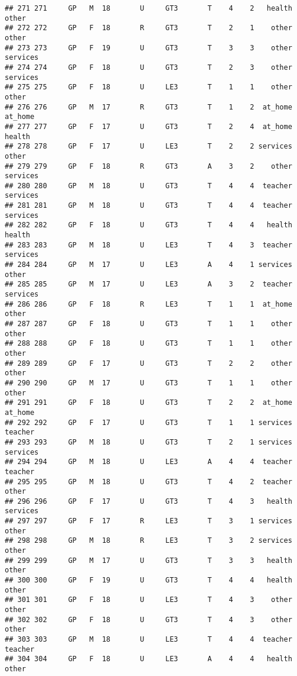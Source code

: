 \documentclass[]{article}
\begin{document}
\begin{verbatim}
## 271 271     GP   M  18       U     GT3       T    4    2   health    other
## 272 272     GP   F  18       R     GT3       T    2    1    other    other
## 273 273     GP   F  19       U     GT3       T    3    3    other services
## 274 274     GP   F  18       U     GT3       T    2    3    other services
## 275 275     GP   F  18       U     LE3       T    1    1    other    other
## 276 276     GP   M  17       R     GT3       T    1    2  at_home  at_home
## 277 277     GP   F  17       U     GT3       T    2    4  at_home   health
## 278 278     GP   F  17       U     LE3       T    2    2 services    other
## 279 279     GP   F  18       R     GT3       A    3    2    other services
## 280 280     GP   M  18       U     GT3       T    4    4  teacher services
## 281 281     GP   M  18       U     GT3       T    4    4  teacher services
## 282 282     GP   F  18       U     GT3       T    4    4   health   health
## 283 283     GP   M  18       U     LE3       T    4    3  teacher services
## 284 284     GP   M  17       U     LE3       A    4    1 services    other
## 285 285     GP   M  17       U     LE3       A    3    2  teacher services
## 286 286     GP   F  18       R     LE3       T    1    1  at_home    other
## 287 287     GP   F  18       U     GT3       T    1    1    other    other
## 288 288     GP   F  18       U     GT3       T    1    1    other    other
## 289 289     GP   F  17       U     GT3       T    2    2    other    other
## 290 290     GP   M  17       U     GT3       T    1    1    other    other
## 291 291     GP   F  18       U     GT3       T    2    2  at_home  at_home
## 292 292     GP   F  17       U     GT3       T    1    1 services  teacher
## 293 293     GP   M  18       U     GT3       T    2    1 services services
## 294 294     GP   M  18       U     LE3       A    4    4  teacher  teacher
## 295 295     GP   M  18       U     GT3       T    4    2  teacher    other
## 296 296     GP   F  17       U     GT3       T    4    3   health services
## 297 297     GP   F  17       R     LE3       T    3    1 services    other
## 298 298     GP   M  18       R     LE3       T    3    2 services    other
## 299 299     GP   M  17       U     GT3       T    3    3   health    other
## 300 300     GP   F  19       U     GT3       T    4    4   health    other
## 301 301     GP   F  18       U     LE3       T    4    3    other    other
## 302 302     GP   F  18       U     GT3       T    4    3    other    other
## 303 303     GP   M  18       U     LE3       T    4    4  teacher  teacher
## 304 304     GP   F  18       U     LE3       A    4    4   health    other

\end{verbatim}
\end{document}
